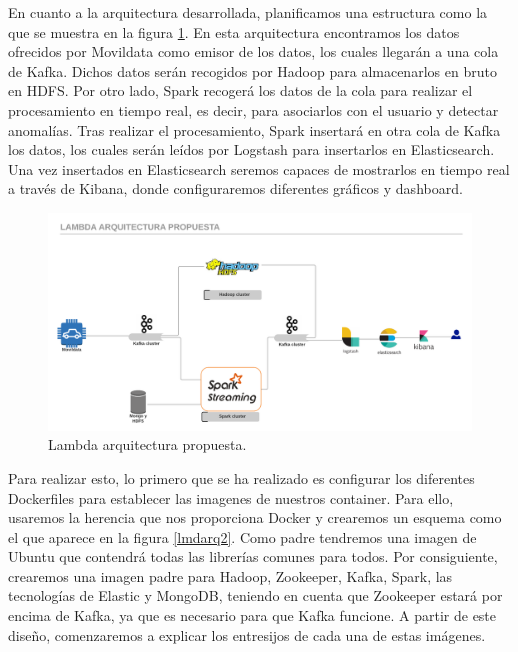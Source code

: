 En cuanto a la arquitectura desarrollada, planificamos una estructura como la que se muestra en la figura \ref{lmdarq1}. En esta arquitectura encontramos los datos ofrecidos por Movildata como emisor de los datos, los cuales llegarán a una cola de Kafka. Dichos datos serán recogidos por Hadoop para almacenarlos en bruto en HDFS. Por otro lado, Spark recogerá los datos de la cola para realizar el procesamiento en tiempo real, es decir, para asociarlos con el usuario y detectar anomalías. Tras realizar el procesamiento, Spark insertará en otra cola de Kafka los datos, los cuales serán leídos por Logstash para insertarlos en Elasticsearch. Una vez insertados en Elasticsearch seremos capaces de mostrarlos en tiempo real a través de Kibana, donde configuraremos diferentes gráficos y dashboard.\par

\begin{figure}[htp]
\centering
\includegraphics[scale=0.28]{Imagenes/arqProp1.png}
\caption{Lambda arquitectura propuesta.}
\label{lmdarq1}
\end{figure}

Para realizar esto, lo primero que se ha realizado es configurar los diferentes Dockerfiles para establecer las imagenes de nuestros container. Para ello, usaremos la herencia que nos proporciona Docker y crearemos un esquema como el que aparece en la figura \ref{lmdarq2}. Como padre tendremos una imagen de Ubuntu que contendrá todas las librerías comunes para todos. Por consiguiente, crearemos una imagen padre para Hadoop, Zookeeper, Kafka, Spark, las tecnologías de Elastic y MongoDB, teniendo en cuenta que Zookeeper estará por encima de Kafka, ya que es necesario para que Kafka funcione. A partir de este diseño, comenzaremos a explicar los entresijos de cada una de estas imágenes.


